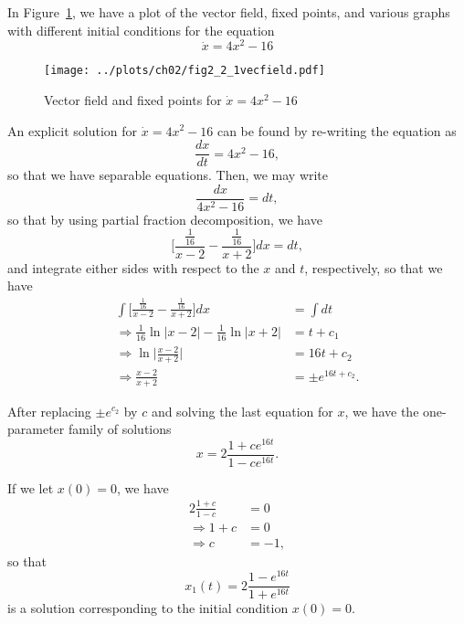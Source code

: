 
In Figure~\ref{fig2_2_1vecfield}, we have a plot of the vector field, fixed points,
and various graphs with different initial conditions for the equation 
\[
    \dot{x} = 4x^2 - 16
\]
\begin{figure}[!ht]
    \texttt{[image: ../plots/ch02/fig2\_2\_1vecfield.pdf]}
    \caption{Vector field and fixed points for $\dot{x} = 4x^2 - 16$\label{fig2_2_1vecfield}}
\end{figure}

An explicit solution for $\dot{x} = 4x^2 - 16$ can be found by re-writing the equation as
\[
    \frac{dx}{dt} = 4x^2 - 16,
\]
so that we have separable equations. Then, we may write
\[
    \frac{dx}{4x^2 - 16} = dt,
\]
so that by using partial fraction decomposition, we have
\[
    \biggl[\frac{\frac{1}{16}}{x - 2} - \frac{\frac{1}{16}}{x + 2}\biggr]dx = dt,
\]
and integrate either sides with respect to the $x$ and $t$, respectively, so that we 
have
\begin{equation*}
    \begin{split}
        \int \biggl[\frac{\frac{1}{16}}{x - 2} - \frac{\frac{1}{16}}{x + 2}\biggr]dx
        &= \int dt \\
        \Rightarrow \frac{1}{16}\ln{\lvert x - 2 \rvert} 
        - \frac{1}{16}\ln{\lvert x + 2 \rvert}
        &= t + c_1 \\
        \Rightarrow \ln{\biggl \lvert \frac{x - 2}{x + 2}\biggr \rvert}
        &= 16t + c_2 \\
        \Rightarrow \frac{x - 2}{x + 2} &= \pm e^{16t + c_2}.
    \end{split}
\end{equation*}

After replacing $\pm e^{c_2}$ by $c$ and solving the last equation for $x$, we have
the one-parameter family of solutions
\[
    x = 2\frac{1 + ce^{16t}}{1 - ce^{16t}}.
\]

If we let $x(0) = 0$, we have
\begin{equation*}
    \begin{split}
        2\frac{1 + c}{1 - c} &= 0 \\
        \Rightarrow 1 + c &= 0 \\
        \Rightarrow c &= -1,
    \end{split}
\end{equation*}
so that 
\[
    x_1(t) = 2\frac{1 - e^{16t}}{1 + e^{16t}}
\]
is a solution corresponding to the initial condition $x(0) = 0$.

